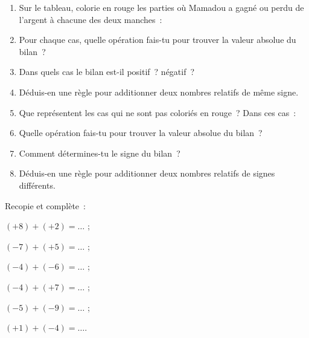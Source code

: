 \begin{activite}
\begin{partie}
\begin{enumerate}
 \item Sur le tableau, colorie en rouge les parties où Mamadou a gagné ou perdu de l'argent à chacune des deux manches :
 \item Pour chaque cas, quelle opération fais-tu pour trouver la valeur absolue du bilan ? 
 \item Dans quels cas le bilan est-il positif ? négatif ?
 \item Déduis-en une règle pour additionner deux nombres relatifs de même signe.
 \item Que représentent les cas qui ne sont pas coloriés en rouge ? Dans ces cas :
 \item Quelle opération fais-tu pour trouver la valeur absolue du bilan ? 
 \item Comment détermines-tu le signe du bilan ? 
 \item Déduis-en une règle pour additionner deux nombres relatifs de signes différents. 
 \end{enumerate}
\end{partie}

\begin{partie}
Recopie et complète :
\begin{colenumerate}{3}
 \item $(+ 8) + (+ 2) = \ldots$ ;
 \item $(- 7) + (+ 5) = \ldots$ ;
 \item $(- 4) + (- 6) = \ldots$ ;
 \item $(- 4) + (+ 7) = \ldots$ ;
 \item $(- 5) + (- 9) = \ldots$ ;
 \item $(+ 1) + (- 4) = \ldots$.
 \end{colenumerate}
\end{partie}

\end{activite}


